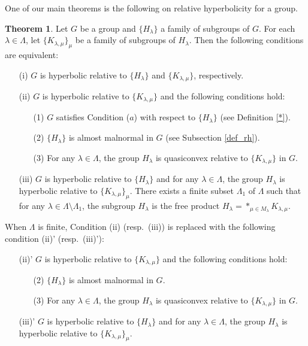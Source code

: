 \documentclass{amsart}
\theoremstyle{definition}
\newtheorem{Thm}{Theorem}[section]
\begin{document}
One of our main theorems is the following on relative hyperbolicity for a group. 

\begin{Thm}\label{blowup}
Let $G$ be a group and $\{H_\lambda \}$ a family of subgroups of $G$. 
For each $\lambda\in\Lambda$, let $\{K_{\lambda, \mu} \}_\mu$ be a family of subgroups of $H_\lambda$. 
Then the following conditions are equivalent:
\begin{enumerate}
\item[(i)] $G$ is hyperbolic relative to $\{H_\lambda \}$ and $\{K_{\lambda, \mu}\}$, respectively. 
\item[(ii)] $G$ is hyperbolic relative to $\{K_{\lambda, \mu}\}$ and the following conditions hold:
\begin{enumerate}
\item[(1)] $G$ satisfies Condition ($a$) with respect to $\{H_\lambda\}$ (see Definition \ref{*}). 
\item[(2)] $\{H_\lambda\}$ is almost malnormal in $G$ (see Subsection \ref{def_rh}). 
\item[(3)] For any $\lambda\in\Lambda$, the group $H_\lambda$ is quasiconvex relative to $\{K_{\lambda, \mu}\}$ in $G$. 
\end{enumerate}
\item[(iii)] $G$ is hyperbolic relative to $\{H_\lambda \}$ and for any $\lambda\in\Lambda$, the group $H_\lambda$ is hyperbolic relative to $\{K_{\lambda, \mu} \}_\mu$. 
There exists a finite subset $\Lambda_1$ of $\Lambda$ such that for any $\lambda\in \Lambda\setminus \Lambda_1$, the subgroup $H_\lambda$ is the free product $H_\lambda=\ast_{\mu\in M_\lambda}K_{\lambda,\mu}$. 
\end{enumerate}
When $\Lambda$ is finite, Condition (ii) (resp.\ (iii)) is replaced with the following condition (ii)' (resp.\ (iii)'):
\begin{enumerate}
\item[(ii)'] $G$ is hyperbolic relative to $\{K_{\lambda,\mu}\}$ and the following conditions hold:
\begin{enumerate}
\item[(2)] $\{H_\lambda\}$ is almost malnormal in $G$. 
\item[(3)] For any $\lambda\in\Lambda$, the group $H_\lambda$ is quasiconvex relative to $\{K_{\lambda, \mu}\}$ in $G$. 
\end{enumerate}
\item[(iii)'] $G$ is hyperbolic relative to $\{H_\lambda\}$ and for any $\lambda\in \Lambda$, the group $H_\lambda$ is hyperbolic relative to $\{K_{\lambda,\mu}\}_\mu$. 
\end{enumerate}
\end{Thm}
\end{document}
